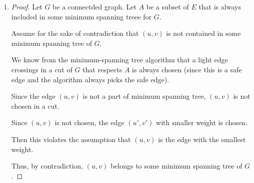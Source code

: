\documentclass[12pt]{article}
\begin{document}
\begin{enumerate}[1.]
    \item

    \bigskip

    \begin{proof}
    Let $G$ be a connectded graph. Let $A$ be a subset of $E$ that is always included
    in some minimum spanning treee for $G$.

    \bigskip

    Assume for the sake of contradiction that $(u,v)$ is not contained in some
    minimum spanning tree of $G$.

    \bigskip

    We know from the minimum-spanning tree algorithm that a light edge crossings in a
    cut of $G$ that respects $A$ is always chosen (since this is a safe edge and the
    algorithm always picks the safe edge).

    \bigskip

    Since the edge $(u,v)$ is not a part of minimum spanning tree, $(u,v)$
    is not chosen in a cut.

    \bigskip

    Since $(u,v)$ is not chosen, the edge $(u',v')$ with smaller weight
    is chosen.

    \bigskip

    Then this violates the assumption that $(u,v)$ is the edge with the smallest weight.

    \bigskip

    Thus, by contradiction, $(u,v)$ belongs to some minimum spanning tree of $G$.

    \end{proof}










\end{enumerate}
\end{document}
